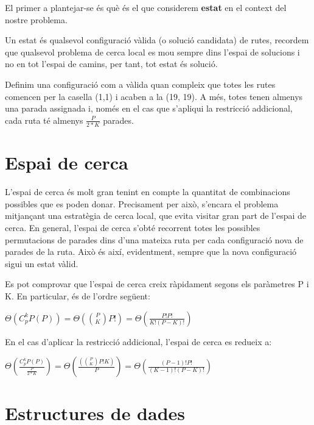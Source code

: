 
El primer a plantejar-se és què és el que considerem \textbf{estat} en el context del nostre problema. 

Un estat és qualsevol configuració vàlida (o solució candidata) de rutes, recordem que qualsevol problema de cerca local es mou sempre dins l'espai de solucions i no en tot l'espai de camins, per tant, tot estat és solució. 

Definim una configuració com a vàlida quan compleix que totes les rutes comencen per la casella (1,1) i acaben a la (19, 19). A més, totes tenen almenys una parada assignada i, només en el cas que s'apliqui la restricció addicional, cada ruta té almenys $\frac{P}{2*K}$ parades.

\section{Espai de cerca} %
\label{sec:espaicerca}

L'espai de cerca és molt gran tenint en compte la quantitat de combinacions possibles que es poden donar. Precisament per això, s'encara el problema mitjançant una estratègia de cerca local, que evita visitar gran part de l'espai de cerca. En general, l'espai de cerca s'obté recorrent totes les possibles permutacions de parades dins d'una mateixa ruta per cada configuració nova de parades de la ruta. Això és així, evidentment, sempre que la nova configuració sigui un estat vàlid. 

Es pot comprovar que l'espai de cerca creix ràpidament segons els paràmetres P i K. En particular, és de l'ordre següent:

\begin{center}
\Large{$\Theta(C_{p}^{k} P(P)) = \Theta({P \choose K} P!) = \Theta(\frac{P!P!}{K!(P-K)!}) $}
\end{center}


En el cas d'aplicar la restricció addicional, l'espai de cerca es redueix a:

\begin{center}
\Large{$\Theta(\frac{C_{p}^{k} P(P)}{\frac{P}{2*K}}) = \Theta(\frac{({P \choose K} P!K)}{P}) = \Theta(\frac{(P-1)!P!}{(K-1)!(P-K)!})$ }
\end{center}

\section{Estructures de dades}	%


